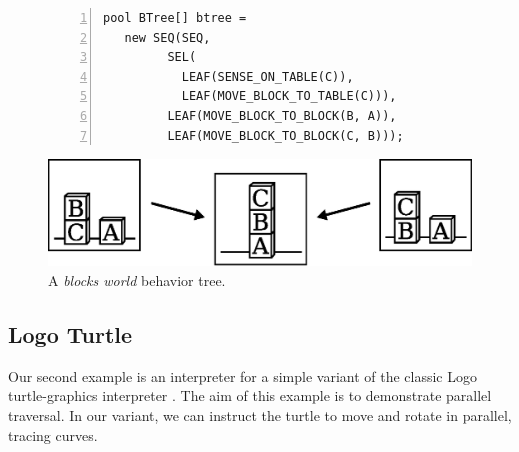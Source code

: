 \documentclass{sig-alternate}
\begin{document}
\begin{figure}[t]
\begin{lstlisting}[numbers=left,xleftmargin=3em]
pool BTree[] btree =
   new SEQ(SEQ,
         SEL(
           LEAF(SENSE_ON_TABLE(C)),
           LEAF(MOVE_BLOCK_TO_TABLE(C))),
         LEAF(MOVE_BLOCK_TO_BLOCK(B, A)),
         LEAF(MOVE_BLOCK_TO_BLOCK(C, B)));
\end{lstlisting}

\centerline{\includegraphics[scale=0.35]{blocksworld2.eps}}
\caption{ A \emph{blocks world} behavior tree.
\label{lst.bt1.example}
}
\end{figure}

\subsection{Logo Turtle}
\label{sec.apps.turtle}

Our second example is an interpreter for a simple variant of the classic Logo
turtle-graphics interpreter \cite{papert.logo}.
The aim of this example is to demonstrate parallel traversal.
In our variant, we can instruct the turtle to move and rotate in parallel, 
tracing curves.

\end{document}
